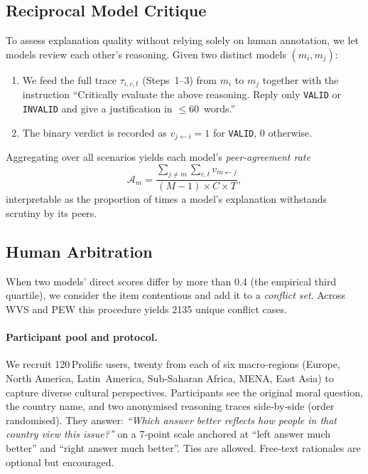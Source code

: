 \documentclass[11pt]{article}
\begin{document}
\subsection{Reciprocal Model Critique}
\label{sec:peer}

To assess explanation quality without relying solely on human annotation, we let models review each other’s reasoning.  
Given two distinct models $(m_i,m_j)$:

\begin{enumerate}[leftmargin=*]
    \item We feed the full trace $\tau_{i,c,t}$ (Steps 1–3) from $m_i$ to $m_j$ together with the instruction “Critically evaluate the above reasoning.  Reply only \texttt{VALID} or \texttt{INVALID} and give a justification in \(\le\)60 words.”
    \item The binary verdict is recorded as $v_{j\leftarrow i}=1$ for \texttt{VALID}, $0$ otherwise.
\end{enumerate}

Aggregating over all scenarios yields each model’s \emph{peer‑agreement rate}  
\[
\mathcal{A}_{m}=\frac{\sum_{j\neq m}\sum_{c,t} v_{m\leftarrow j}}{(M-1)\times C\times T},
\] 
interpretable as the proportion of times a model’s explanation withstands scrutiny by its peers.

\subsection{Human Arbitration}
\label{sec:human}

When two models’ direct scores differ by more than 0.4 (the empirical third quartile), we consider the item contentious and add it to a \emph{conflict set}.  
Across WVS and PEW this procedure yields 2135 unique conflict cases.

\paragraph{Participant pool and protocol.}
We recruit 120 Prolific users, twenty from each of six macro‑regions (Europe, North America, Latin America, Sub‑Saharan Africa, MENA, East Asia) to capture diverse cultural perspectives.  
Participants see the original moral question, the country name, and two anonymised reasoning traces side‑by‑side (order randomised).  
They answer:  
\emph{“Which answer better reflects how people in that country view this issue?”}  
on a 7‑point scale anchored at “left answer much better” and “right answer much better”.  
Ties are allowed.  
Free‑text rationales are optional but encouraged.
\end{document}
